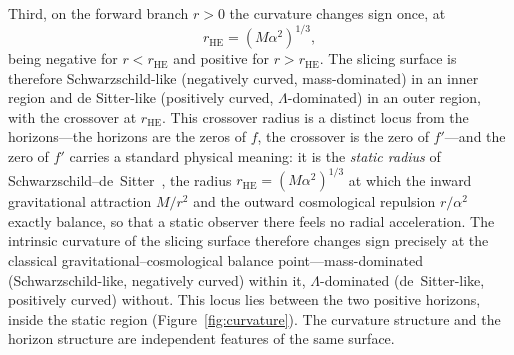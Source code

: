\documentclass[11pt,a4paper]{article}
\theoremstyle{definition}
\begin{document}
Third, on the forward branch $r>0$ the curvature changes sign once, at
\begin{equation}\label{eq:rflat}
  r_{\mathrm{HE}}=(M\alpha^{2})^{1/3},
\end{equation}
being negative for $r<r_{\mathrm{HE}}$ and positive for $r>r_{\mathrm{HE}}$. The slicing surface is therefore Schwarzschild-like (negatively curved, mass-dominated) in an inner region and de Sitter-like (positively curved, $\Lambda$-dominated) in an outer region, with the crossover at $r_{\mathrm{HE}}$. This crossover radius is a distinct locus from the horizons---the horizons are the zeros of $f$, the crossover is the zero of $f'$---and the zero of $f'$ carries a standard physical meaning: it is the \emph{static radius} of Schwarzschild--de~Sitter~\cite{StuchlikHledik1999}, the radius $r_{\mathrm{HE}}=(M\alpha^{2})^{1/3}$ at which the inward gravitational attraction $M/r^{2}$ and the outward cosmological repulsion $r/\alpha^{2}$ exactly balance, so that a static observer there feels no radial acceleration. The intrinsic curvature of the slicing surface therefore changes sign precisely at the classical gravitational--cosmological balance point---mass-dominated (Schwarzschild-like, negatively curved) within it, $\Lambda$-dominated (de~Sitter-like, positively curved) without. This locus lies between the two positive horizons, inside the static region (Figure~\ref{fig:curvature}). The curvature structure and the horizon structure are independent features of the same surface.
\end{document}
